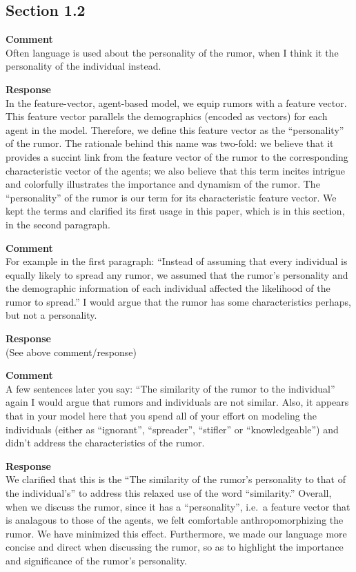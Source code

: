 \subsection{Section 1.2}
\setcounter{rev2-1.2}{1}

\textbf{Comment } \\
Often language is used about the personality of the rumor, when I think it the personality of the individual instead.

\textbf{Response } \\
In the feature-vector, agent-based model, we equip rumors with a feature vector.
This feature vector parallels the demographics (encoded as vectors) for each agent in the model.
Therefore, we define this feature vector as the ``personality'' of the rumor.
The rationale behind this name was two-fold: we believe that it provides a succint link from the feature vector of the rumor to the corresponding characteristic vector of the agents; we also believe that this term incites intrigue and colorfully illustrates the importance and dynamism of the rumor.
The ``personality'' of the rumor is our term for its characteristic feature vector.
We kept the terms and clarified its first usage in this paper, which is in this section, in the second paragraph.


\textbf{Comment } \\
For example in the ﬁrst paragraph: ``Instead of assuming that every individual is equally likely to spread any rumor, we assumed that the rumor’s personality and the demographic information of each individual affected the likelihood of the rumor to spread.''
I would argue that the rumor has some characteristics perhaps, but not a personality.

\textbf{Response } \\
(See above comment/response)

\textbf{Comment } \\
A few sentences later you say: ``The similarity of the rumor to the individual\textellipsis'' again I would argue that rumors and individuals are not similar.
Also, it appears that in your model here that you spend all of your effort on modeling the individuals (either as ``ignorant'', ``spreader'', ``stiﬂer'' or ``knowledgeable'') and didn't address the characteristics of the rumor.

\textbf{Response } \\
We clarified that this is the ``The similarity of the rumor's personality to that of the individual's'' to address this relaxed use of the word ``similarity.''
Overall, when we discuss the rumor, since it has a ``personality'', i.e.\ a feature vector that is analagous to those of the agents, we felt comfortable anthropomorphizing the rumor.
We have minimized this effect.
Furthermore, we made our language more concise and direct when discussing the rumor, so as to highlight the importance and significance of the rumor's personality.
